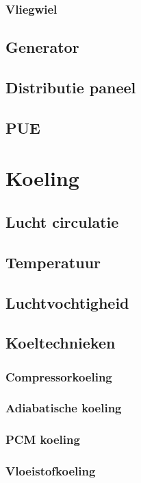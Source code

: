 \documentclass[a4paper,12pt,twoside,openright,titlepage]{book}
\begin{document}
\subsection{Vliegwiel}

\section{Generator}

\section{Distributie paneel}

\section{PUE}


\chapter{Koeling}

\section{Lucht circulatie}

\section{Temperatuur}

\section{Luchtvochtigheid}

\section{Koeltechnieken}
\subsection{Compressorkoeling}

\subsection{Adiabatische koeling}

\subsection{PCM koeling}

\subsection{Vloeistofkoeling}

\end{document}
